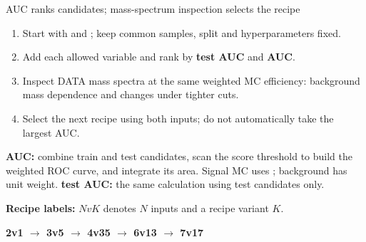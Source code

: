\begin{frame}[label=p11_20260920]{AUC ranks candidates; mass-spectrum inspection selects the recipe}
\begin{enumerate}\item Start with  and ; keep common samples, split and hyperparameters fixed.\item Add each allowed variable and rank by \textbf{test AUC} and \textbf{AUC}.\item Inspect DATA mass spectra at the same weighted MC efficiency: background mass dependence and changes under tighter cuts.\item Select the next recipe using both inputs; do not automatically take the largest AUC.\end{enumerate}{\small\textbf{AUC:} combine train and test candidates, scan the score threshold to build the weighted ROC curve, and integrate its area. Signal MC uses ; background has unit weight. \textbf{test AUC:} the same calculation using test candidates only.}\par\vspace{0.2em}
{\small\textbf{Recipe labels:} $NvK$ denotes $N$ inputs and a recipe variant $K$.}\par\begin{center}\textbf{2v1 $\rightarrow$ 3v5 $\rightarrow$ 4v35 $\rightarrow$ 6v13 $\rightarrow$ 7v17}\end{center}\par\vspace{0.2em}

\end{frame}

